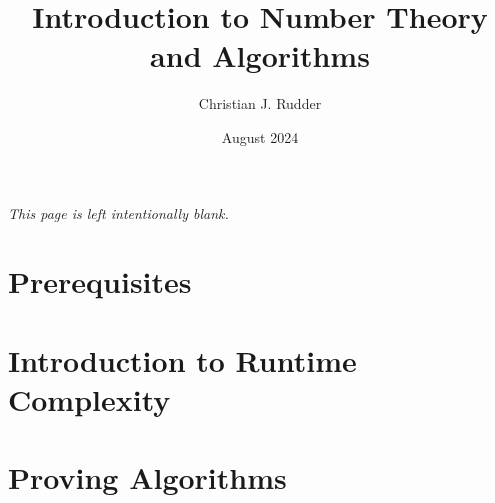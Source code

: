 \documentclass{memoir}
\title{Introduction to Number Theory and Algorithms}
\author{Christian J. Rudder}
\date{August 2024}
\begin{document}
\maketitle
\setcounter{tocdepth}{2}

\tableofcontents

\newpage
\thispagestyle{empty}
\mbox{}
\vfill
\begin{center}
    \textit{This page is left intentionally blank.}
\end{center}
\vfill
\newpage

\chapter*{Prerequisites}

\chapter{Introduction to Runtime Complexity}

\chapter{Proving Algorithms}

\end{document}
